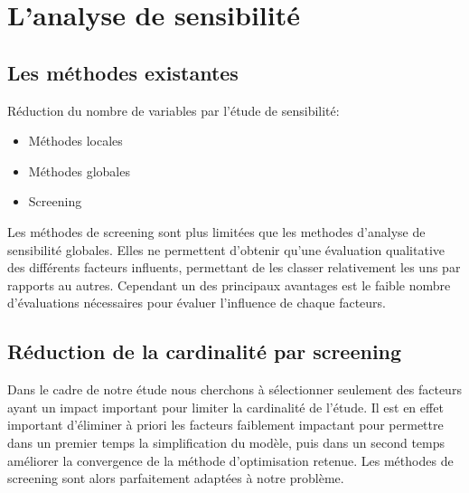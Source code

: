 



\section{L’analyse de sensibilité} %
\label{sec:l_analyse_de_sensibilite}

\subsection{Les méthodes existantes} %
\label{sub:les_méthodes_existantes}
Réduction du nombre de variables par l’étude de sensibilité:
\begin{itemize}
    \item Méthodes locales
    \item Méthodes globales
    \item Screening
\end{itemize}

Les méthodes de screening sont plus limitées que les methodes d’analyse de sensibilité
globales. Elles ne permettent d’obtenir qu’une évaluation qualitative des différents
facteurs influents, permettant de les classer relativement les uns par rapports au autres.
Cependant un des principaux avantages est le faible nombre d’évaluations nécessaires
pour évaluer l’influence de chaque facteurs.

\subsection{Réduction de la cardinalité par screening} %
\label{sub:reduction_de_la_cardinalite_par_screening}

Dans le cadre de notre étude nous cherchons à sélectionner seulement des facteurs
ayant un impact important pour limiter la cardinalité de l’étude. Il est en effet important
d’éliminer à priori les facteurs faiblement impactant pour permettre dans un premier temps
la simplification du modèle, puis dans un second temps améliorer la convergence
de la méthode d’optimisation retenue.
Les méthodes de screening sont alors parfaitement adaptées à notre problème.

